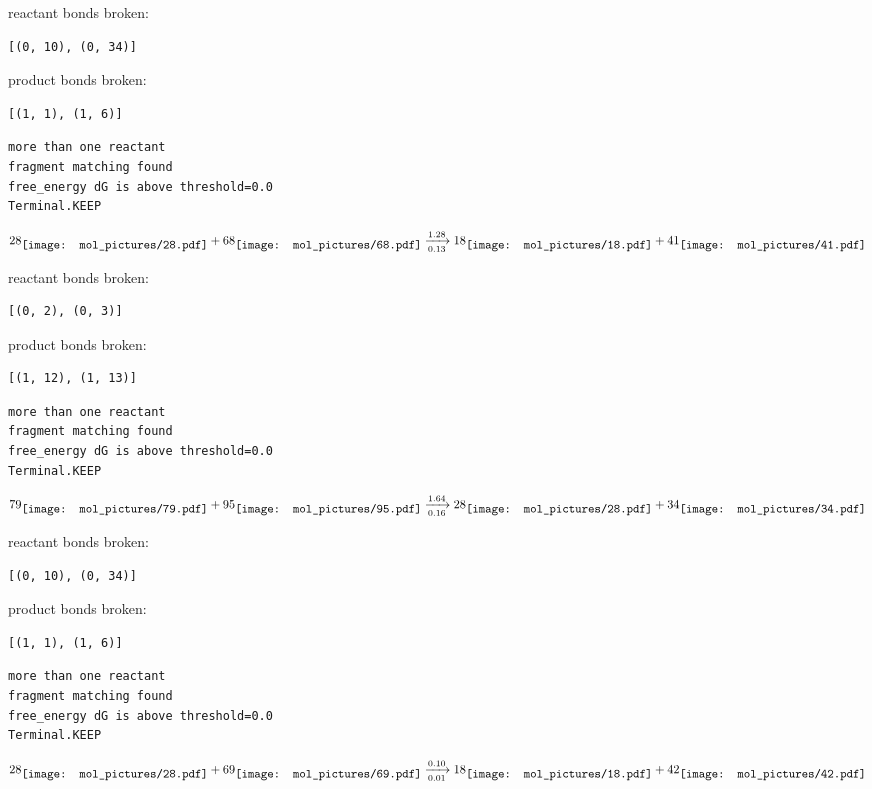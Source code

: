 \documentclass{article}
\begin{document}
reactant bonds broken:\begin{verbatim}
[(0, 10), (0, 34)]
\end{verbatim}
product bonds broken:\begin{verbatim}
[(1, 1), (1, 6)]
\end{verbatim}




\vspace{1cm}
\begin{verbatim}
more than one reactant
fragment matching found
free_energy dG is above threshold=0.0
Terminal.KEEP
\end{verbatim}
$$
28
\raisebox{-.5\height}{\texttt{[image: mol\_pictures/28.pdf]}}
+
68
\raisebox{-.5\height}{\texttt{[image: mol\_pictures/68.pdf]}}
\xrightarrow[0.13]{1.28}
18
\raisebox{-.5\height}{\texttt{[image: mol\_pictures/18.pdf]}}
+
41
\raisebox{-.5\height}{\texttt{[image: mol\_pictures/41.pdf]}}
$$


reactant bonds broken:\begin{verbatim}
[(0, 2), (0, 3)]
\end{verbatim}
product bonds broken:\begin{verbatim}
[(1, 12), (1, 13)]
\end{verbatim}




\vspace{1cm}
\begin{verbatim}
more than one reactant
fragment matching found
free_energy dG is above threshold=0.0
Terminal.KEEP
\end{verbatim}
$$
79
\raisebox{-.5\height}{\texttt{[image: mol\_pictures/79.pdf]}}
+
95
\raisebox{-.5\height}{\texttt{[image: mol\_pictures/95.pdf]}}
\xrightarrow[0.16]{1.64}
28
\raisebox{-.5\height}{\texttt{[image: mol\_pictures/28.pdf]}}
+
34
\raisebox{-.5\height}{\texttt{[image: mol\_pictures/34.pdf]}}
$$


reactant bonds broken:\begin{verbatim}
[(0, 10), (0, 34)]
\end{verbatim}
product bonds broken:\begin{verbatim}
[(1, 1), (1, 6)]
\end{verbatim}




\vspace{1cm}
\begin{verbatim}
more than one reactant
fragment matching found
free_energy dG is above threshold=0.0
Terminal.KEEP
\end{verbatim}
$$
28
\raisebox{-.5\height}{\texttt{[image: mol\_pictures/28.pdf]}}
+
69
\raisebox{-.5\height}{\texttt{[image: mol\_pictures/69.pdf]}}
\xrightarrow[0.01]{0.10}
18
\raisebox{-.5\height}{\texttt{[image: mol\_pictures/18.pdf]}}
+
42
\raisebox{-.5\height}{\texttt{[image: mol\_pictures/42.pdf]}}
$$
\end{document}
